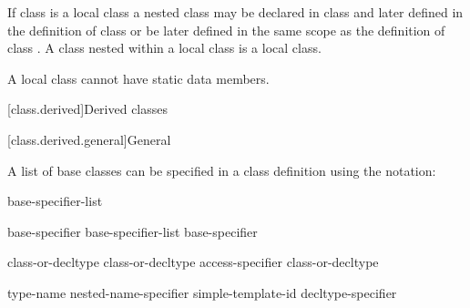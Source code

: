 \pnum
{}%
If class  is a local class a nested class  may be
declared in class  and later defined in the definition of class
 or be later defined in the same scope as the definition of
class .
%
A class nested within
a local class is a local class.

\pnum
{}%
\begin{note}
A local class cannot have static data members.
\end{note}

[class.derived]{Derived classes}%

[class.derived.general]{General}%


\pnum
{}%
%
%
A list of base classes can be specified in a class definition using
the notation:
\begin{bnf}
\br
    \terminal{:} base-specifier-list
\end{bnf}


\begin{bnf}
\br
    base-specifier \br
    base-specifier-list \terminal{,} base-specifier 
\end{bnf}

\begin{bnf}
\br
     class-or-decltype\br
       class-or-decltype\br
     access-specifier  class-or-decltype
\end{bnf}

\begin{bnf}
\br
     type-name\br
    nested-name-specifier  simple-template-id\br
    decltype-specifier
\end{bnf}

%
%
\begin{bnf}
\br
    \br
    \br
\end{bnf}

